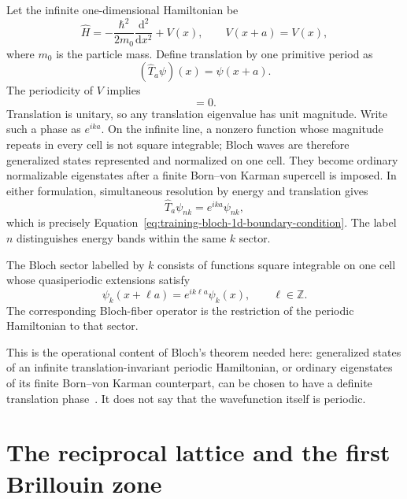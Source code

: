 Let the infinite one-dimensional Hamiltonian be
\begin{equation}
  \widehat H
  =-\frac{\hbar^2}{2m_0}\frac{\mathrm d^2}{\mathrm d x^2}+V(x),
  \qquad
  V(x+a)=V(x),
  \label{eq:training-bloch-1d-parent}
\end{equation}
where $m_0$ is the particle mass. Define translation by one primitive period as
\begin{equation}
  (\widehat T_a\psi)(x)=\psi(x+a).
\end{equation}
The periodicity of $V$ implies
\begin{equation}
  [\widehat H,\widehat T_a]=0.
\end{equation}
Translation is unitary, so any translation eigenvalue has unit magnitude. Write
such a phase as $e^{ika}$. On the infinite line, a nonzero function whose
magnitude repeats in every cell is not square integrable; Bloch waves are
therefore generalized states represented and normalized on one cell. They
become ordinary normalizable eigenstates after a finite Born--von Karman
supercell is imposed. In either formulation, simultaneous resolution by energy
and translation gives
\begin{equation}
  \widehat T_a\psi_{nk}=e^{ika}\psi_{nk},
\end{equation}
which is precisely Equation~\eqref{eq:training-bloch-1d-boundary-condition}.
The label $n$ distinguishes energy bands within the same $k$ sector.

\begin{definition}
The Bloch sector labelled by $k$ consists of functions square integrable on one
cell whose quasiperiodic extensions satisfy
\begin{equation}
  \psi_k(x+\ell a)=e^{ik\ell a}\psi_k(x),
  \qquad \ell\in\mathbb Z.
  \label{eq:training-bloch-1d-sector}
\end{equation}
The corresponding Bloch-fiber operator is the restriction of the periodic
Hamiltonian to that sector.
\end{definition}

This is the operational content of Bloch's theorem needed here: generalized
states of an infinite translation-invariant periodic Hamiltonian, or ordinary
eigenstates of its finite Born--von Karman counterpart, can be chosen to have a
definite translation phase~\cite{kittel2004,simon2013}. It does not say that the
wavefunction itself is periodic.

\section{The reciprocal lattice and the first Brillouin zone}

